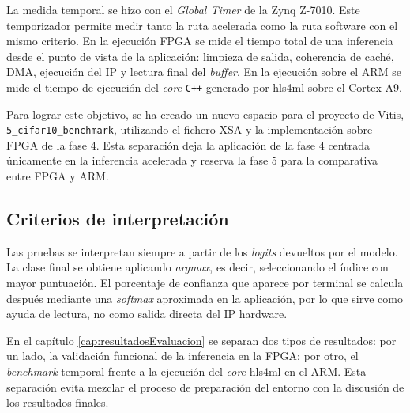 La medida temporal se hizo con el \textit{Global Timer} de la Zynq Z-7010. Este temporizador permite
medir tanto la ruta acelerada como la ruta software con el mismo criterio. En la
ejecución \ac{FPGA} se
mide el tiempo total de una inferencia desde el punto de vista de la aplicación: limpieza de salida,
coherencia de caché, \ac{DMA}, ejecución del \ac{IP} y lectura final del \textit{buffer}.
En la ejecución sobre el \ac{ARM}
se mide el tiempo de ejecución del \textit{core} \texttt{C++} generado por hls4ml sobre
el Cortex-A9.

Para lograr este objetivo, se ha creado un nuevo espacio para el proyecto de Vitis,
\texttt{5\_cifar10\_benchmark}, utilizando el fichero \ac{XSA} y la implementación sobre
\ac{FPGA} de la fase
4. Esta separación deja la aplicación de la fase 4 centrada únicamente en la inferencia acelerada y
reserva la fase 5 para la comparativa entre \ac{FPGA} y \ac{ARM}.

\subsection{Criterios de interpretación}
Las pruebas se interpretan siempre a partir de los \textit{logits} devueltos por el
modelo. La clase final
se obtiene aplicando \textit{argmax}, es decir, seleccionando el índice con mayor puntuación. El
porcentaje de confianza que aparece por terminal se calcula después mediante una
\textit{softmax} aproximada
en la aplicación, por lo que sirve como ayuda de lectura, no como salida directa del
\ac{IP} hardware.

En el capítulo \ref{cap:resultadosEvaluacion} se separan dos tipos de resultados: por un lado, la
validación funcional de la inferencia en la \ac{FPGA}; por otro, el \textit{benchmark}
temporal frente a la
ejecución del \textit{core} hls4ml en el \ac{ARM}. Esta separación evita mezclar el
proceso de preparación del
entorno con la discusión de los resultados finales.
